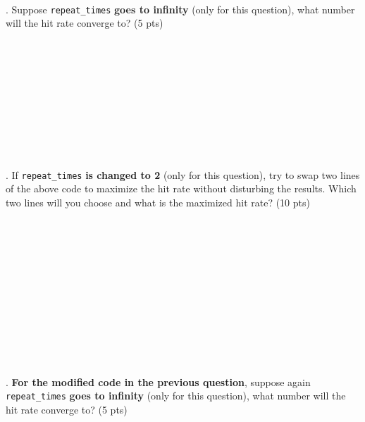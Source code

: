 \documentclass{article}
\begin{document}
~\\
\newpage
{}. Suppose \lstinline{repeat_times} \textbf{goes to infinity} (only for this question), what number will the hit rate converge to?{\color{red} (5 pts)}
~\\
~\\
~\\
~\\
~\\
~\\
~\\
~\\
~\\
~\\
~\\
. If \lstinline{repeat_times} \textbf{is changed to 2} (only for this question), try to swap two lines of the above code to maximize the hit rate without disturbing the results. Which two lines will you choose and what is the maximized hit rate?{\color{red} (10 pts)}
~\\
~\\
~\\
~\\
~\\
~\\
~\\
~\\
~\\
~\\
~\\
~\\
~\\
. \textbf{For the modified code in the previous question}, suppose again \\ \lstinline{repeat_times} \textbf{goes to infinity} (only for this question), what number will the hit rate converge to?{\color{red} (5 pts)}
\end{document}
